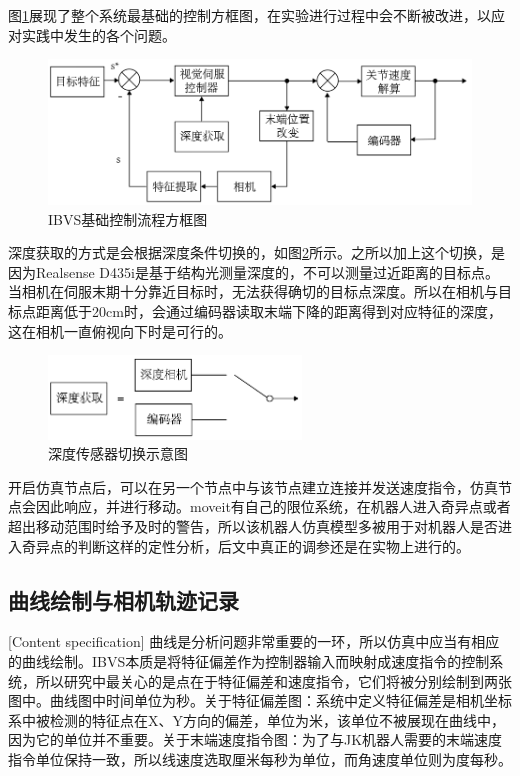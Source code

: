 \documentclass[fontset=fandol,type=bachelor,campus=harbin]{hithesisbook}
\begin{document}
图\ref{IBVS基础控制流程方框图}展现了整个系统最基础的控制方框图，在实验进行过程中会不断被改进，以应对实践中发生的各个问题。
\begin{figure}[h]
\centering
\includegraphics[width = 1.0\textwidth]{chapter2/IBVS基础控制流程方框图}
\caption{IBVS基础控制流程方框图}
\label{IBVS基础控制流程方框图}
\end{figure}


深度获取的方式是会根据深度条件切换的，如图\ref{深度传感器切换}所示。之所以加上这个切换，是因为Realsense D435i是基于结构光测量深度的，不可以测量过近距离的目标点。当相机在伺服末期十分靠近目标时，无法获得确切的目标点深度。所以在相机与目标点距离低于20cm时，会通过编码器读取末端下降的距离得到对应特征的深度，这在相机一直俯视向下时是可行的。


\begin{figure}[h]
\centering
\includegraphics[width = 0.60\textwidth]{chapter2/深度选择图}
\caption{深度传感器切换示意图}
\label{深度传感器切换}
\end{figure}


开启仿真节点后，可以在另一个节点中与该节点建立连接并发送速度指令，仿真节点会因此响应，并进行移动。moveit有自己的限位系统，在机器人进入奇异点或者超出移动范围时给予及时的警告，所以该机器人仿真模型多被用于对机器人是否进入奇异点的判断这样的定性分析，后文中真正的调参还是在实物上进行的。
\subsection{曲线绘制与相机轨迹记录}[Content specification]
曲线是分析问题非常重要的一环，所以仿真中应当有相应的曲线绘制。IBVS本质是将特征偏差作为控制器输入而映射成速度指令的控制系统，所以研究中最关心的是点在于特征偏差和速度指令，它们将被分别绘制到两张图中。曲线图中时间单位为秒。关于特征偏差图：系统中定义特征偏差是相机坐标系中被检测的特征点在X、Y方向的偏差，单位为米，该单位不被展现在曲线中，因为它的单位并不重要。关于末端速度指令图：为了与JK机器人需要的末端速度指令单位保持一致，所以线速度选取厘米每秒为单位，而角速度单位则为度每秒。
\end{document}
